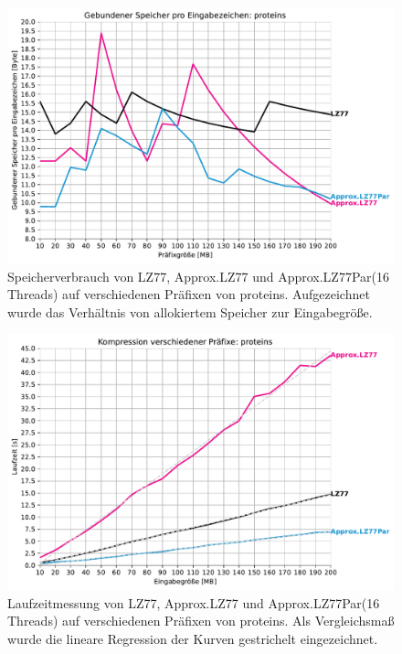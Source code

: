 \begin{figure}[H]
    \centering
    \includegraphics[scale=0.65]{Images/progressive_mem.pdf}
    \caption{Speicherverbrauch von LZ77, Approx.LZ77 und Approx.LZ77Par(16 Threads) auf verschiedenen Präfixen von proteins. Aufgezeichnet wurde das Verhältnis
    von allokiertem Speicher zur Eingabegröße.}
    \label{memory}
\end{figure}

\begin{figure}[H]
    \centering
    \includegraphics[scale=0.65]{Images/progressive_proteins.pdf}
    \caption{Laufzeitmessung von LZ77, Approx.LZ77 und Approx.LZ77Par(16 Threads) auf verschiedenen Präfixen von proteins. Als Vergleichsmaß wurde 
    die lineare Regression der Kurven gestrichelt eingezeichnet.}
    \label{runtime}
\end{figure}
    
